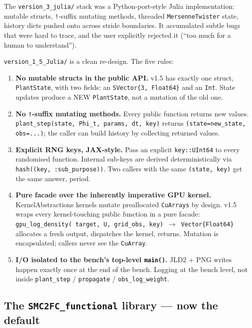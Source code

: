 \documentclass[11pt,a4paper]{article}
\begin{document}
The \texttt{version\_3\_julia/} stack was a Python-port-style Julia
implementation: mutable structs, \texttt{!}-suffix mutating methods,
threaded \texttt{MersenneTwister} state, history dicts pushed onto
across stride boundaries. It accumulated subtle bugs that were hard
to trace, and the user explicitly rejected it (``too much for a
human to understand'').

\texttt{version\_1\_5\_Julia/} is a clean re-design. The five rules:

\begin{enumerate}[itemsep=2pt]
  \item \textbf{No mutable structs in the public API.} v1.5 has
        exactly one struct, \texttt{PlantState}, with two fields:
        an \texttt{SVector\{3, Float64\}} and an \texttt{Int}. State
        updates produce a NEW \texttt{PlantState}, not a mutation
        of the old one.
  \item \textbf{No \texttt{!}-suffix mutating methods.} Every public
        function returns new values. \texttt{plant\_step(state,
        Phi\_t, params, dt, key)} returns
        \texttt{(state=new\_state, obs=...)}; the caller can build
        history by collecting returned values.
  \item \textbf{Explicit RNG keys, JAX-style.} Pass an explicit
        \texttt{key::UInt64} to every randomised function. Internal
        sub-keys are derived deterministically via
        \texttt{hash((key, :sub\_purpose))}. Two callers with the
        same \texttt{(state, key)} get the same answer, period.
  \item \textbf{Pure facade over the inherently imperative GPU
        kernel.} KernelAbstractions kernels mutate preallocated
        \texttt{CuArrays} by design. v1.5 wraps every kernel-touching
        public function in a pure facade: \texttt{gpu\_log\_density(
        target, U, grid\_obs, key) $\to$ Vector\{Float64\}} allocates
        a fresh output, dispatches the kernel, returns. Mutation is
        encapsulated; callers never see the \texttt{CuArray}.
  \item \textbf{I/O isolated to the bench's top-level
        \texttt{main()}.} JLD2 + PNG writes happen exactly once at
        the end of the bench. Logging at the bench level, not inside
        \texttt{plant\_step} / \texttt{propagate} /
        \texttt{obs\_log\_weight}.
\end{enumerate}

\subsection{The \texttt{SMC2FC\_functional} library --- now the default}
\end{document}

